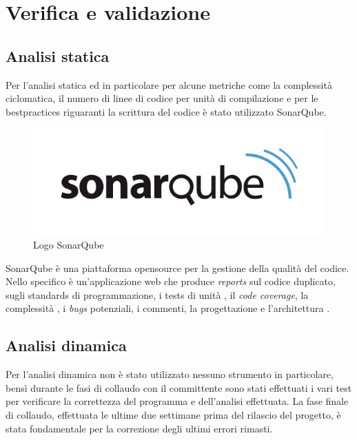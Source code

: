 \chapter{Verifica e validazione}
\label{chap:verifica}

\section{Analisi statica}
Per l'analisi statica ed in particolare per alcune metriche come la complessità  ciclomatica, il numero di linee di codice per unità di compilazione e per le \gls{bestpractices} riguaranti la scrittura del codice è stato utilizzato SonarQube. 

\begin{figure}
\begin{center}
\includegraphics[width=0.5\columnwidth]{images/sonarqube-logo.png}
\end{center}
\caption{Logo SonarQube}
\label{fig:sonar}
\end{figure}

SonarQube è una piattaforma \gls{opensource} per la gestione della qualità  del codice. Nello specifico è un’applicazione web che produce \textit{reports} sul codice duplicato, sugli standards di programmazione, i tests di unità , il \textit{code coverage}, la complessità , i \textit{bugs} potenziali, i commenti, la progettazione e l’architettura \cite{sonarqube}.
\section{Analisi dinamica}
Per l'analisi dinamica non è stato utilizzato nessuno strumento in particolare, bensì durante le fasi di collaudo con il committente sono stati effettuati i vari test per verificare la correttezza del programma e dell'analisi effettuata. La fase finale di collaudo, effettuata le ultime due settimane prima del rilascio del progetto, è stata fondamentale per la correzione degli ultimi errori rimasti.
